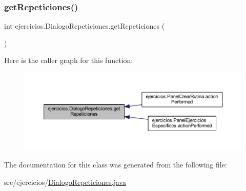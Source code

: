 \subsubsection{\texorpdfstring{get\+Repeticiones()}{getRepeticiones()}}
{\footnotesize\ttfamily int ejercicios.\+Dialogo\+Repeticiones.\+get\+Repeticiones (\begin{DoxyParamCaption}{ }\end{DoxyParamCaption})}

Here is the caller graph for this function\+:
\nopagebreak
\begin{figure}[H]
\begin{center}
\leavevmode
\includegraphics[width=350pt]{classejercicios_1_1_dialogo_repeticiones_a02413008932361f0cd47f23fcdff84e8_icgraph}
\end{center}
\end{figure}


The documentation for this class was generated from the following file\+:\begin{DoxyCompactItemize}
\item 
src/ejercicios/\mbox{\hyperlink{_dialogo_repeticiones_8java}{Dialogo\+Repeticiones.\+java}}\end{DoxyCompactItemize}
